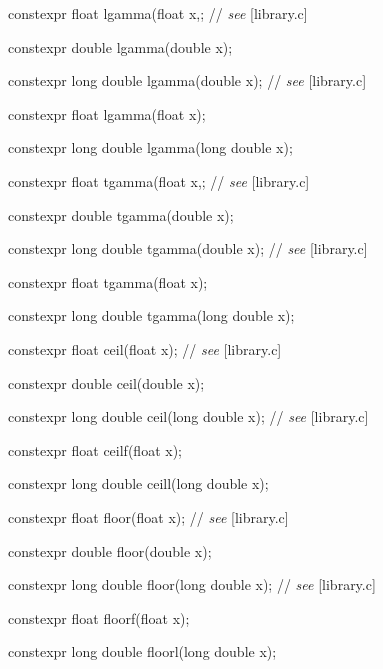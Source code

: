 \documentclass[prd,twocolumn,amsmath,amssymb,nofootinbib,eqsecnum]{revtex4-1}
\newcommand{\highlight}[1]{{\color{red} #1}}
\newcommand{\oldhighlight}[1]{{\color{green} #1}}
\newcommand{\stdcomment}[1]{{// {\em see} [#1]}}
\begin{document}
{\vspace{2ex}


\highlight{constexpr} float lgamma(float x,; \stdcomment{library.c}

\highlight{constexpr} double lgamma(double x);

\highlight{constexpr} long double lgamma(double x); \stdcomment{library.c}

\highlight{constexpr} float lgamma(float x);

\highlight{constexpr} long double lgamma(long double x);

\vspace{2ex}

\highlight{constexpr} float tgamma(float x,; \stdcomment{library.c}

\highlight{constexpr} double tgamma(double x);

\highlight{constexpr} long double tgamma(double x); \stdcomment{library.c}

\highlight{constexpr} float tgamma(float x);

\highlight{constexpr} long double tgamma(long double x);

\vspace{2ex}

\oldhighlight{constexpr} float ceil(float x); \stdcomment{library.c}

\oldhighlight{constexpr} double ceil(double x);

\oldhighlight{constexpr} long double ceil(long double x); \stdcomment{library.c}

\oldhighlight{constexpr} float ceilf(float x);

\oldhighlight{constexpr} long double ceill(long double x);

\vspace{2ex}


\oldhighlight{constexpr} float floor(float x); \stdcomment{library.c}

\oldhighlight{constexpr} double floor(double x);

\oldhighlight{constexpr} long double floor(long double x); \stdcomment{library.c}

\oldhighlight{constexpr} float floorf(float x);

\oldhighlight{constexpr} long double floorl(long double x);

\vspace{2ex}

}
\end{document}

